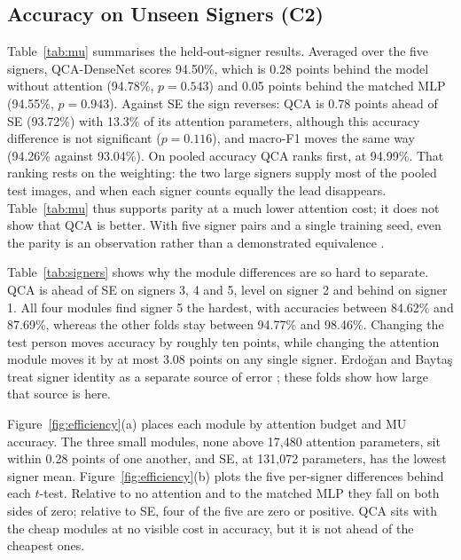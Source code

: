 \documentclass[10pt,twocolumn]{article}
\newcommand{\QCA}{QCA}
\begin{document}
\subsection{Accuracy on Unseen Signers (C2)}
\label{sec:res-mu}

Table~\ref{tab:mu} summarises the held-out-signer results. Averaged over the
five signers, QCA-DenseNet scores 94.50\%, which is 0.28 points behind the
model without attention (94.78\%, $p=0.543$) and 0.05 points behind the
matched MLP (94.55\%, $p=0.943$). Against SE the sign reverses: \QCA{} is
0.78 points ahead of SE (93.72\%) with 13.3\% of its attention parameters,
although this accuracy difference is not significant ($p=0.116$), and
macro-F1 moves the same way (94.26\% against 93.04\%). On pooled accuracy
\QCA{} ranks first, at 94.99\%. That ranking rests on the weighting: the two
large signers supply most of the pooled test images, and when each signer
counts equally the lead disappears. Table~\ref{tab:mu} thus supports parity
at a much lower attention cost; it does not show that \QCA{} is better. With
five signer pairs and a single training seed, even the parity is an
observation rather than a demonstrated equivalence
\citep{bouthillier_2021_variance}.



Table~\ref{tab:signers} shows why the module differences are so hard to
separate. \QCA{} is ahead of SE on signers 3, 4 and 5, level on signer 2
and behind on signer 1. All four modules find signer 5 the hardest, with
accuracies between 84.62\% and 87.69\%, whereas the other folds stay between
94.77\% and 98.46\%. Changing the test person moves accuracy by
roughly ten points, while changing the attention module moves it by at most
3.08 points on any single signer. Erdo\u{g}an and Bayta\c{s} treat signer
identity as a separate source of error \citep{erdogan_2024_signer}; these
folds show how large that source is here.



Figure~\ref{fig:efficiency}(a) places each module by attention budget and
MU accuracy. The three small modules, none above 17,480 attention
parameters, sit within 0.28 points of one another, and SE, at 131,072
parameters, has the lowest signer mean. Figure~\ref{fig:efficiency}(b)
plots the five per-signer differences behind each $t$-test. Relative to no
attention and to the matched MLP they fall on both sides of zero; relative
to SE, four of the five are zero or positive. \QCA{} sits with the cheap
modules at no visible cost in accuracy, but it is not ahead of the
cheapest ones.
\end{document}
